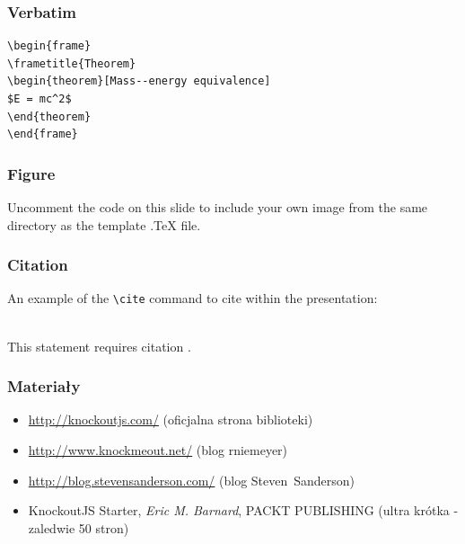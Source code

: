 \documentclass{beamer}
\begin{document}

\begin{frame}[fragile] %
\frametitle{Verbatim}
\begin{example}
\begin{verbatim}
\begin{frame}
\frametitle{Theorem}
\begin{theorem}[Mass--energy equivalence]
$E = mc^2$
\end{theorem}
\end{frame}\end{verbatim}
\end{example}
\end{frame}


\begin{frame}
\frametitle{Figure}
Uncomment the code on this slide to include your own image from the same directory as the template .TeX file.
\end{frame}


\begin{frame}[fragile] %
\frametitle{Citation}
An example of the \verb|\cite| command to cite within the presentation:\\~

This statement requires citation \cite{p1}.
\end{frame}


\begin{frame}
	\frametitle{Materiały}
	\begin{itemize}
		\item
			\url{http://knockoutjs.com/} (oficjalna strona biblioteki)
		\item
			\url{http://www.knockmeout.net/} (blog rniemeyer)
		\item
			\url{http://blog.stevensanderson.com/} (blog Steven~Sanderson)
		\item
			KnockoutJS Starter, \textit{Eric M. Barnard}, PACKT PUBLISHING 
			(ultra krótka - zaledwie 50 stron)
	\end{itemize}
\end{frame}
\end{document}
